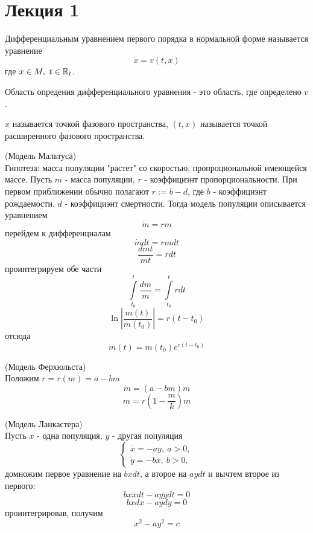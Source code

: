 \section{Лекция 1}
\begin{definition}
    Дифференциальным уравнением первого порядка в нормальной форме называется уравнение 
    \[\dot{x}=v(t,x)\]
    где $x\in M,\ t\in \mathbb{R}_t$.
\end{definition} 
\begin{definition}
    Область опредения дифференциального уравнения - это область, где определено $v$.
\end{definition} 
\begin{definition}
    $x$ называется точкой фазового пространства, $(t,x)$ называется точкой расширенного фазового пространства.
\end{definition} 
\begin{example} (Модель Мальтуса)\\
    Гипотеза: масса популяции "растет" со скоростью, пропроциональной имеющейся массе. Пусть $m$ - масса популяции, $r$ - коэффициэнт пропорциональности. При первом приближении обычно полагают $r:= b-d$, где $b$ - коэффициэнт рождаемости, $d$ - коэффициэнт смертности. Тогда модель популяции описывается уравнением
    \[\dot{m}=rm\]
    перейдем к дифференциалам
    \[\dot{m}dt=rmdt\]
    \[\frac{dmt}{mt}=rdt\]
    проинтегрируем обе части
    \[\int\limits_{t_0}^{t}\frac{dm}{m}=\int\limits_{t_0}^{t}rdt\]
    \[\ln{\left|\frac{m(t)}{m(t_0)}\right|=r(t-t_0)}\]
    отсюда
    \[\boxed{m(t)=m(t_0)e^{r(t-t_0)}}\]
\end{example}
\begin{example} (Модель Ферхюльста)\\
    Положим $r=r(m)=a-bm$
    \[\dot{m}=(a-bm)m\]
    \[\dot{m}=r(1-\frac{m}{k})m\]
\end{example}
\begin{example} (Модель Ланкастера)\\
    Пусть $x$ - одна популяция, $y$ - другая популяция
    \[\begin{cases}
        \dot{x}=-ay,\ a>0,\\
        \dot{y}=-bx,\ b>0.
    \end{cases}\]
    домножим первое уравнение на $bxdt$, а второе на $aydt$ и вычтем второе из первого:
    \[bx\dot{x}dt-ay\dot{y}dt=0\]
    \[bxdx-aydy=0\]
    проинтегрировав, получим
    \[\boxed{x^2-ay^2=c}\]
\end{example}
